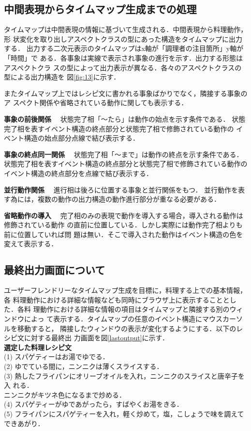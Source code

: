 \subsection{中間表現からタイムマップ生成までの処理}

タイムマップは中間表現の情報に基づいて生成される．中間表現から料理動作，形
状変化を取り出しアスペクトクラスの型にあった構造をタイムマップに出力する．
出力する二次元表示のタイムマップはx軸が「調理者の注目箇所」y軸が「時間」で
ある．各事象は実線で表示され事象の進行を示す．出力する形態はアスペクトクラ
スの型によって出力表示が異なる．各々のアスペクトクラスの型による出力構造を
図\ref{fig:13}に示す．


またタイムマップ上ではレシピ文に書かれる事象ばかりでなく，隣接する事象のア
スペクト関係や省略されている動作に関しても表示する．

{\bf 事象の前後関係}~~
 状態完了相「〜たら」は動作の始点を示す条件である．
 状態完了相を表すイベント構造の終点部分と状態完了相で修飾されている動作の
 イベント構造の始点部分点線で結び表示する．

{\bf 事象の終点同一関係}~~
 状態完了相「〜まで」は動作の終点を示す条件である．
 状態完了相を表すイベント構造の終点部分と状態完了相で修飾されている動作の
 イベント構造の終点部分を点線で結び表示する．


{\bf 並行動作関係}~~
 進行相は後ろに位置する事象と並行関係をもつ．
 並行動作を表す為には，複数の動作の出力構造の動作進行部分が重なる必要がある．

{\bf 省略動作の導入}~~
 完了相のみの表現で動作を導入する場合，導入される動作は修飾されている動作
 の直前に位置している．しかし実際には動作完了相よりも前に位置していれば問
 題は無い．そこで導入された動作はイベント構造の色を変えて表示する．


\subsection{最終出力画面について}

ユーザーフレンドリーなタイムマップ生成を目標に，料理する上での基本情報，各
料理動作における詳細な情報なども同時にブラウザ上に表示することとした．各料
理動作における詳細な情報の項目はタイムマップと隣接する別のウィンドウによっ
て表示する．タイムマップの任意のイベント構造にマウスカーソルを移動すると，
隣接したウィンドウの表示が変化するようにする．以下のレシピ文に対する最終出
力画面を図\ref{lastoutput}に示す．\\

{\bf 選定した料理レシピ文}\\
(1) スパゲティーはお湯でゆでる．\\
(2) ゆでている間に，ニンニクは薄くスライスする．\\
(3) 熱したフライパンにオリーブオイルを入れ，ニンニクのスライスと唐辛子を入
れる．\\
\hspace*{6mm}ニンニクがキツネ色になるまで炒める． \\
(4) スパゲティーがゆであがったら，すばやくお湯をきる．\\
(5) フライパンにスパゲティーを入れ，軽く炒めて，塩，こしょうで味を調えてできあがり．

